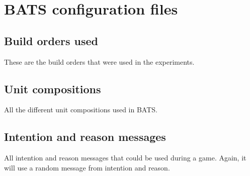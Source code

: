 \chapter{BATS configuration files}
\section{Build orders used}
\label{sec:build_orders_in_bats}
These are the build orders that were used in the experiments.




\clearpage
\section{Unit compositions}
\label{sec:unit_compositons_in_bats}
All the different unit compositions used in BATS.




\clearpage
\section{Intention and reason messages}
\label{sec:intention_and_reason_messages}
All intention and reason messages that could be used during a game. Again, it will use a random message from intention and reason.

